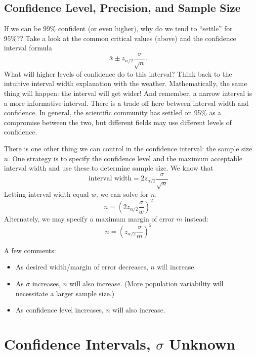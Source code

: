 \documentclass[
]{book}
\providecommand{\tightlist}{%
  \setlength{\itemsep}{0pt}\setlength{\parskip}{0pt}}
\begin{document}
\hypertarget{confidence-level-precision-and-sample-size}{%
\subsection{Confidence Level, Precision, and Sample Size}\label{confidence-level-precision-and-sample-size}}

If we can be 99\% confident (or even higher), why do we tend to ``settle'' for 95\%?? Take a look at the common critical values (above) and the confidence interval formula \[\bar{x} \pm z_{\alpha/2}\frac{\sigma}{\sqrt{n}}.\] What will higher levels of confidence do to this interval? Think back to the intuitive interval width explanation with the weather. Mathematically, the same thing will happen: the interval will get wider! And remember, a narrow interval is a more informative interval. There is a trade off here between interval width and confidence. In general, the scientific community has settled on 95\% as a compromise between the two, but different fields may use different levels of confidence.

There is one other thing we can control in the confidence interval: the sample size \(n\). One strategy is to specify the confidence level and the maximum acceptable interval width and use these to determine sample size. We know that \[\text{interval width}=2z_{\alpha/2}\frac{\sigma}{\sqrt{n}}\] Letting interval width equal \(w\), we can solve for \(n\): \[ n = \left(2z_{\alpha/2}\frac{\sigma}{w}\right)^2\] Alternately, we may specify a maximum margin of error \(m\) instead: \[ n = \left(z_{\alpha/2}\frac{\sigma}{m}\right)^2\]

A few comments:

\begin{itemize}
\tightlist
\item
  As desired width/margin of error decreases, \(n\) will increase.
\item
  As \(\sigma\) increases, \(n\) will also increase. (More population variability will necessitate a larger sample size.)
\item
  As confidence level increases, \(n\) will also increase.
\end{itemize}

\hypertarget{confidence-intervals-sigma-unknown}{%
\section{\texorpdfstring{Confidence Intervals, \(\sigma\) Unknown}{Confidence Intervals, \textbackslash sigma Unknown}}\label{confidence-intervals-sigma-unknown}}
\end{document}
